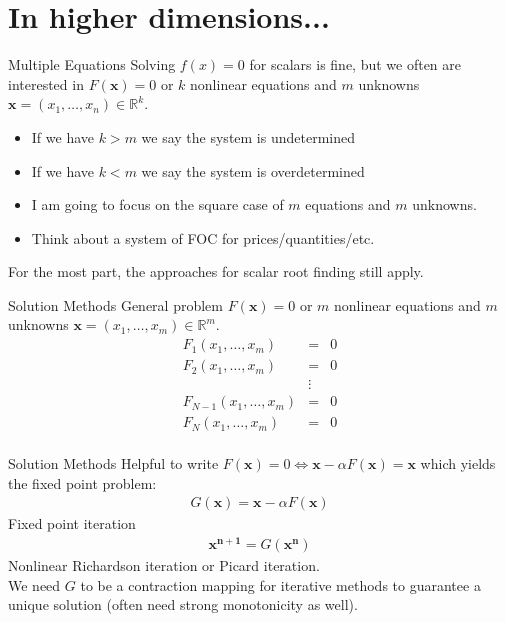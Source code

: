 \documentclass[xcolor=pdftex,dvipsnames,table,mathserif,aspectratio=169]{beamer}
\begin{document}
\section{In higher dimensions...}

\begin{frame}{Multiple Equations}
Solving $f(x) = 0$ for scalars is fine, but we often are interested in $F(\mathbf{x}) = 0$ or $k$ nonlinear equations and $m$ unknowns $\mathbf{x} = (x_1,\ldots, x_n) \in \mathbb{R}^k$.
\begin{itemize}
\item If we have $k>m$ we say the system is \alert{undetermined}
\item If we have $k<m$ we say the system is \alert{overdetermined}
\item I am going to focus on the \alert{square} case of $m$ equations and $m$ unknowns.
\item Think about a system of FOC for prices/quantities/etc.
\end{itemize}
For the most part, the approaches for scalar root finding still apply.
\end{frame}

\begin{frame}{Solution Methods}
\vspace{0.5cm}
General problem $F(\mathbf{x}) = 0$ or $m$ nonlinear equations and $m$ unknowns $\mathbf{x} = (x_1,\ldots, x_m) \in \mathbb{R}^m$.
\begin{eqnarray*}
F_1 (x_1,\ldots, x_m)  &=& 0 \\
F_2 (x_1,\ldots, x_m)  &=& 0\\
&\vdots&\\ 
F_{N-1} (x_1,\ldots, x_m)  &=& 0\\
F_N (x_1,\ldots, x_m)  &=& 0\\
\end{eqnarray*}
\end{frame} 

\begin{frame}{Solution Methods}
Helpful to write $F(\mathbf{x}) = 0 \Leftrightarrow \mathbf{x} - \alpha F(\mathbf{x}) = \mathbf{x}$ which yields the fixed point problem:
\begin{eqnarray*}
G(\mathbf{x}) = \mathbf{x} -\alpha F(\mathbf{x})
\end{eqnarray*}
Fixed point iteration
\begin{eqnarray*}
\mathbf{x^{n+1}} = G(\mathbf{x^n})
\end{eqnarray*}
Nonlinear Richardson iteration or Picard iteration.\\
\vspace{0.5cm}
We need $G$ to be a \alert{contraction mapping} for iterative methods to guarantee a unique solution (often need strong monotonicity as well).
\end{frame} 
\end{document}
